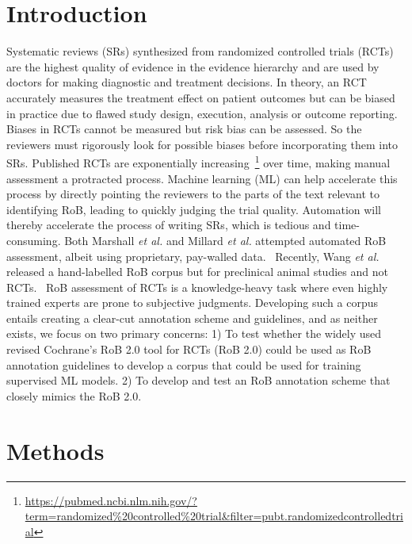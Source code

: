 \documentclass{IOS-Book-Article}
\begin{document}
\section{Introduction}
\label{sec:intro}
%
Systematic reviews (SRs) synthesized from randomized controlled trials (RCTs) are the highest quality of evidence in the evidence hierarchy and are used by doctors for making diagnostic and treatment decisions.
In theory, an RCT accurately measures the treatment effect on patient outcomes but can be biased in practice due to flawed study design, execution, analysis or outcome reporting.~\cite{hariton2018randomised}
Biases in RCTs cannot be measured but risk bias can be assessed.
So the reviewers must rigorously look for possible biases before incorporating them into SRs.
Published RCTs are exponentially increasing~\footnote{\url{https://pubmed.ncbi.nlm.nih.gov/?term=randomized\%20controlled\%20trial&filter=pubt.randomizedcontrolledtrial}} over time, making manual assessment a protracted process.
Machine learning (ML) can help accelerate this process by directly pointing the reviewers to the parts of the text relevant to identifying RoB, leading to quickly judging the trial quality.
Automation will thereby accelerate the process of writing SRs, which is tedious and time-consuming.
Both Marshall \textit{et al.} and Millard \textit{et al.} attempted automated RoB assessment, albeit using proprietary, pay-walled data.~\cite{marshall2015automating,millard2016machine}
Recently, Wang \textit{et al.} released a hand-labelled RoB corpus but for preclinical animal studies and not RCTs.~\cite{wang2022risk}
RoB assessment of RCTs is a knowledge-heavy task where even highly trained experts are prone to subjective judgments.
Developing such a corpus entails creating a clear-cut annotation scheme and guidelines, and as neither exists, we focus on two primary concerns:
1) To test whether the widely used revised Cochrane's RoB 2.0 tool for RCTs (RoB 2.0) could be used as RoB annotation guidelines to develop a corpus that could be used for training supervised ML models.
2) To develop and test an RoB annotation scheme that closely mimics the RoB 2.0.~\cite{lansbury2020co,sterne2019rob}
%
%
%
\section{Methods}
\label{sec:methods}
%
\end{document}
